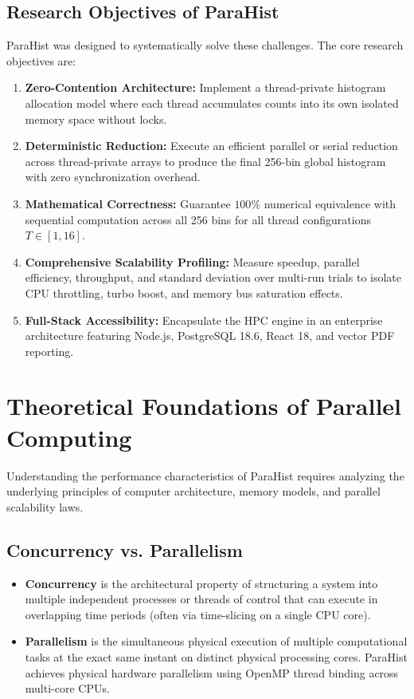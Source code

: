 \documentclass[12pt,a4paper,oneside]{report}
\begin{document}
\section{Research Objectives of ParaHist}
ParaHist was designed to systematically solve these challenges. The core research objectives are:
\begin{enumerate}
    \item \textbf{Zero-Contention Architecture:} Implement a thread-private histogram allocation model where each thread accumulates counts into its own isolated memory space without locks.
    \item \textbf{Deterministic Reduction:} Execute an efficient parallel or serial reduction across thread-private arrays to produce the final 256-bin global histogram with zero synchronization overhead.
    \item \textbf{Mathematical Correctness:} Guarantee $100\%$ numerical equivalence with sequential computation across all 256 bins for all thread configurations $T \in [1, 16]$.
    \item \textbf{Comprehensive Scalability Profiling:} Measure speedup, parallel efficiency, throughput, and standard deviation over multi-run trials to isolate CPU throttling, turbo boost, and memory bus saturation effects.
    \item \textbf{Full-Stack Accessibility:} Encapsulate the HPC engine in an enterprise architecture featuring Node.js, PostgreSQL 18.6, React 18, and vector PDF reporting.
\end{enumerate}

\chapter{Theoretical Foundations of Parallel Computing}

Understanding the performance characteristics of ParaHist requires analyzing the underlying principles of computer architecture, memory models, and parallel scalability laws.

\section{Concurrency vs. Parallelism}
\begin{itemize}
    \item \textbf{Concurrency} is the architectural property of structuring a system into multiple independent processes or threads of control that can execute in overlapping time periods (often via time-slicing on a single CPU core).
    \item \textbf{Parallelism} is the simultaneous physical execution of multiple computational tasks at the exact same instant on distinct physical processing cores. ParaHist achieves physical hardware parallelism using OpenMP thread binding across multi-core CPUs.
\end{itemize}
\end{document}
